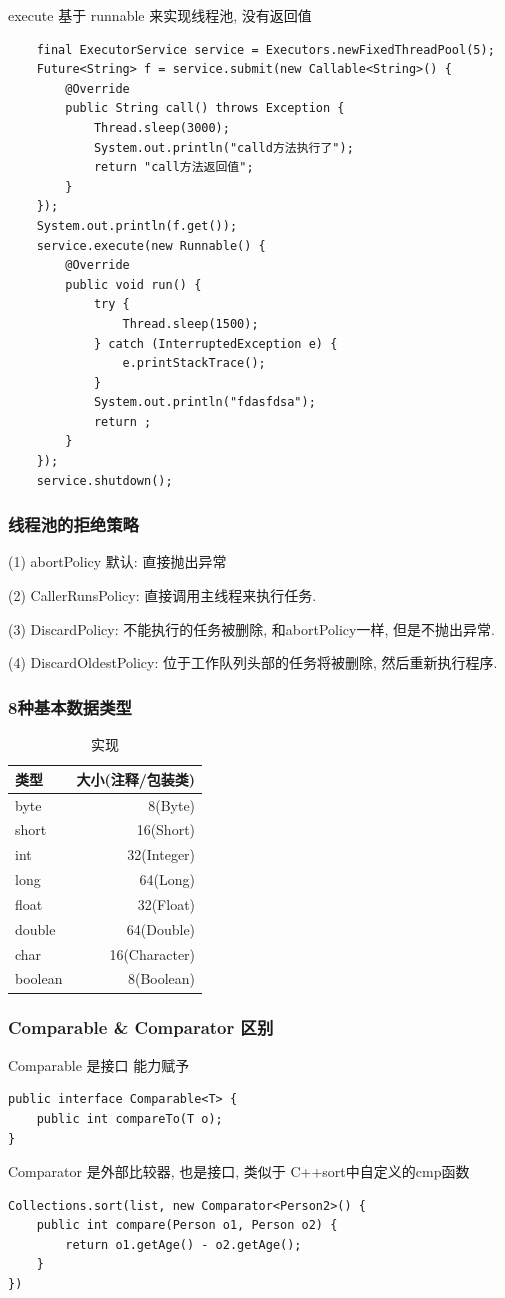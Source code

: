 \documentclass[UTF8]{ctexart}
\begin{document}
execute 基于 runnable 来实现线程池, 没有返回值
\begin{lstlisting}
    final ExecutorService service = Executors.newFixedThreadPool(5);
	Future<String> f = service.submit(new Callable<String>() {
		@Override
		public String call() throws Exception {
			Thread.sleep(3000);
			System.out.println("calld方法执行了");
			return "call方法返回值";
		}
	});
	System.out.println(f.get());
	service.execute(new Runnable() {
		@Override
		public void run() {
			try {
				Thread.sleep(1500);
			} catch (InterruptedException e) {
				e.printStackTrace();
			}
			System.out.println("fdasfdsa");
			return ;
		}
	});
	service.shutdown();
\end{lstlisting}
\subsubsection{线程池的拒绝策略}
(1) abortPolicy 默认: 直接抛出异常 \par
(2) CallerRunsPolicy:  直接调用主线程来执行任务. \par
(3) DiscardPolicy: 不能执行的任务被删除, 和abortPolicy一样, 但是不抛出异常. \par
(4) DiscardOldestPolicy: 位于工作队列头部的任务将被删除, 然后重新执行程序. \par
\subsubsection{8种基本数据类型}
\begin{table}[!htbp]
	\centering
	\caption{实现}
	\begin{tabular}{|l|r|}

		\hline
		类型    & 大小(注释/包装类) \\
		\hline
		byte    & 8(Byte)           \\
		\hline
		short   & 16(Short)         \\
		\hline
		int     & 32(Integer)       \\
		\hline
		long    & 64(Long)          \\
		\hline
		float   & 32(Float)         \\
		\hline
		double  & 64(Double)        \\
		\hline
		char    & 16(Character)     \\
		\hline
		boolean & 8(Boolean)        \\
		\hline
	\end{tabular}
\end{table}
\subsubsection{Comparable \& Comparator 区别}
Comparable 是接口 能力赋予
\begin{lstlisting}
public interface Comparable<T> {
	public int compareTo(T o);
}
\end{lstlisting}
Comparator 是外部比较器, 也是接口, 类似于 C++sort中自定义的cmp函数
\begin{lstlisting}
Collections.sort(list, new Comparator<Person2>() {
	public int compare(Person o1, Person o2) {
		return o1.getAge() - o2.getAge();
	}
})
\end{lstlisting}
\end{document}
